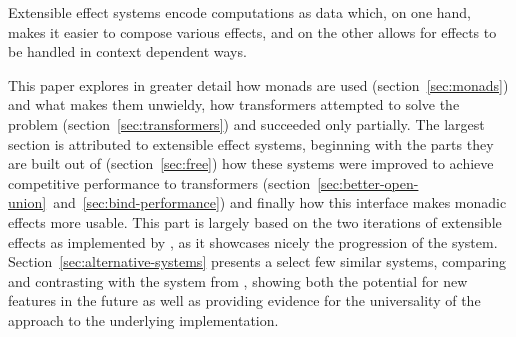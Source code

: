 Extensible effect systems encode computations as data which, on one hand, makes
it easier to compose various effects, and on the other allows for effects to be
handled in context dependent ways.

This paper explores %
in greater detail how monads are used (section~\ref{sec:monads}) and what makes
them unwieldy, how transformers attempted to solve the problem
(section~\ref{sec:transformers}) and succeeded only partially. The largest
section is attributed to extensible effect systems, beginning with the parts
they are built out of (section~\ref{sec:free}) how these systems were improved
to achieve competitive performance to transformers
(section~\ref{sec:better-open-union}~and~\ref{sec:bind-performance}) and finally
how this interface makes monadic effects more usable. This part is largely based
on the two iterations of extensible effects as implemented by \citeauthor{freer},
as it showcases nicely the progression of the system.
Section~\ref{sec:alternative-systems} presents a select few similar systems,
comparing and contrasting with the system from \citeauthor{freer}, showing both
the potential for new features in the future as well as providing evidence for
the universality of the approach to the underlying implementation.
